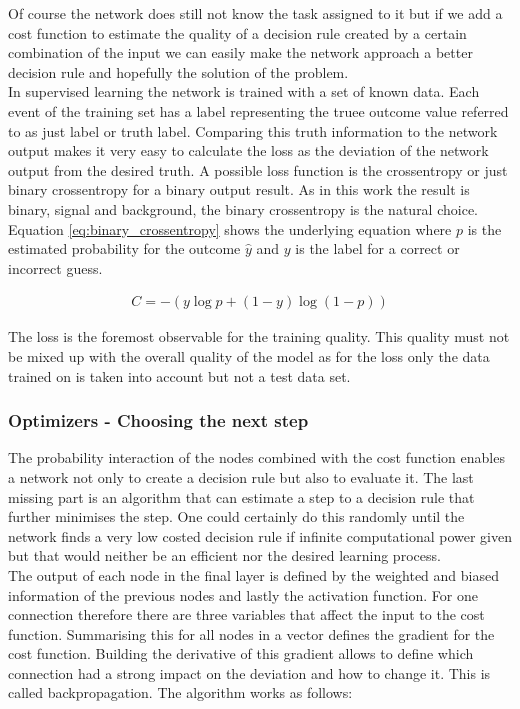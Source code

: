 Of course the network does still not know the task assigned to it but if we add a cost function to estimate the quality of a decision rule created by a certain combination of the input we can easily make the network approach a better decision rule and hopefully the solution of the problem.\\
In supervised learning the network is trained with a set of known data. Each event of the training set has a label representing the truee outcome value referred to as just label or truth label. Comparing this truth information to the network output makes it very easy to calculate the loss as the deviation of the network output from the desired truth. A possible loss function is the crossentropy or just binary crossentropy for a binary output result. As in this work the result is binary, signal and background, the binary crossentropy is the natural choice. Equation \eqref{eq:binary_crossentropy} shows the underlying equation where $p$ is the estimated probability for the outcome $\hat{y}$ and $y$ is the label for a  correct or incorrect guess.

\begin{align}
    C = -(y \log p + (1 - y) \log (1 - p) )
    \label{eq:binary_crossentropy}
\end{align}

The loss is the foremost observable for the training quality. This quality must not be mixed up with the overall quality of the model as for the loss only the data trained on is taken into account but not a test data set.

\subsubsection{Optimizers - Choosing the next step}

The probability interaction of the nodes combined with the cost function enables a network not only to create a decision rule but also to evaluate it. The last missing part is an algorithm that can estimate a step to a decision rule that further minimises the step. One could certainly do this randomly until the network finds a very low costed decision rule if infinite computational power given but that would neither be an efficient nor the desired learning process.\\
The output of each node in the final layer is defined by the weighted and biased information of the previous nodes and lastly the activation function. For one connection therefore there are three variables that affect the input to the cost function. Summarising this for all nodes in a vector defines the gradient for the cost function. Building the derivative of this gradient allows to define which connection had a strong impact on the deviation and how to change it. This is called backpropagation. The algorithm works as follows:

